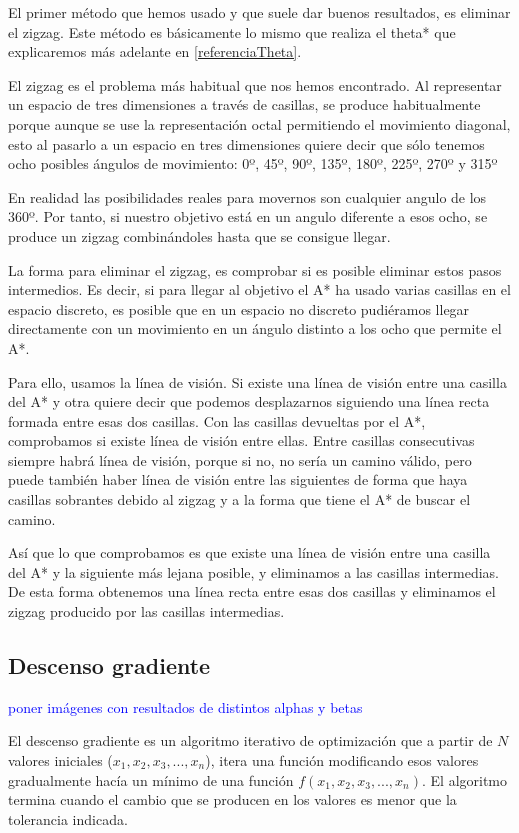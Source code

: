 El primer método que hemos usado y que suele dar buenos resultados, es eliminar el zigzag. Este método es básicamente lo mismo que realiza el theta* que explicaremos más adelante en \ref{referenciaTheta}.

El zigzag es el problema más habitual que nos hemos encontrado. Al representar un espacio de tres dimensiones a través de casillas, se produce habitualmente porque aunque se use la representación octal permitiendo el movimiento diagonal, esto al pasarlo a un espacio en tres dimensiones quiere decir que sólo tenemos ocho posibles ángulos de movimiento: 0º, 45º, 90º, 135º, 180º, 225º, 270º y 315º

En realidad las posibilidades reales para movernos son cualquier angulo de los 360º. Por tanto, si nuestro objetivo está en un angulo diferente a esos ocho, se produce un zigzag combinándoles hasta que se consigue llegar.

La forma para eliminar el zigzag, es comprobar si es posible eliminar estos pasos intermedios. Es decir, si para llegar al objetivo el A* ha usado varias casillas en el espacio discreto, es posible que en un espacio no discreto pudiéramos llegar directamente con un movimiento en un ángulo distinto a los ocho que permite el A*.

Para ello, usamos la línea de visión. Si existe una línea de visión entre una casilla del A* y otra quiere decir que podemos desplazarnos siguiendo una línea recta formada entre esas dos casillas. Con las casillas devueltas por el A*, comprobamos si existe línea de visión entre ellas. Entre casillas consecutivas siempre habrá línea de visión, porque si no, no sería un camino válido, pero puede también haber línea de visión entre las siguientes de forma que haya casillas sobrantes debido al zigzag y a la forma que tiene el A* de buscar el camino.

Así que lo que comprobamos es que existe una línea de visión entre una casilla del A* y la siguiente más lejana posible, y eliminamos a las casillas intermedias. De esta forma obtenemos una línea recta entre esas dos casillas y eliminamos el zigzag producido por las casillas intermedias.

\subsection{Descenso gradiente}
\textcolor{blue}{poner imágenes con resultados de distintos alphas y betas}

El descenso gradiente es un algoritmo iterativo de optimización que a partir de $N$ valores iniciales ($x_1, x_2, x_3, ..., x_n$), itera una función modificando esos valores gradualmente hacía un mínimo de una función $f(x_1, x_2, x_3, ..., x_n)$. El algoritmo termina cuando el cambio que se producen en los valores es menor que la tolerancia indicada.

